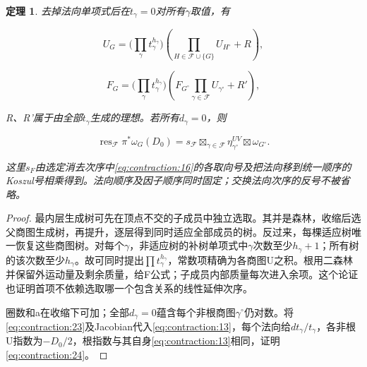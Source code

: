 \documentclass[11pt,a4paper,oneside]{ctexart}
\theoremstyle{cnplain}
\newtheorem{theorem}{定理}[section]
\theoremstyle{definition}
\theoremstyle{remark}
\numberwithin{equation}{section}
\begin{document}
\begin{theorem}

\label{thm:contraction:6.1} 去掉法向单项式后在\(t_\gamma =0\)对所有\(\gamma \)取值，有

\begin{equation}
U_G=\Big(\prod_\gamma t_\gamma^{h_\gamma}\Big)
       \left(\prod_{H\in\mathscr F\cup\{G\}}U_{H^\circ}+R\right),
\end{equation}

\begin{equation}
F_G=\Big(\prod_\gamma t_\gamma^{h_\gamma}\Big)
       \left(F_{G^\circ}\prod_{\gamma\in\mathscr F}U_{\gamma^\circ}
                                                       +R'\right),          \label{eq:contraction:23}
\end{equation}

R、R'属于由全部\(t_\gamma \)生成的理想。若所有\(d_\gamma =0\)，则

\begin{equation}
\operatorname{res}_{\mathscr F}\pi^*\omega_G(D_0)
        =s_{\mathscr F}\mathop{\boxtimes}_{\gamma\in\mathscr F}\eta_{\gamma^\circ}^{UV}
                                                \boxtimes\omega_{G^\circ}.
                                                                    \label{eq:contraction:24}
\end{equation}

这里\(s_F\)由选定消去次序中\eqref{eq:contraction:16}的各取向号及把法向移到统一顺序的Koszul号相乘得到。法向顺序及因子顺序同时固定；交换法向次序的反号不被省略。

\end{theorem}

\begin{proof}

最内层生成树可先在顶点不交的子成员中独立选取。其并是森林，收缩后选父商图生成树，再提升，逐层得到同时适应全部成员的树。反过来，每棵适应树唯一恢复这些商图树。对每个\(\gamma \)，非适应树的补树单项式中\(\gamma \)次数至少\(h_\gamma +1\)；所有树的该次数至少\(h_\gamma \)。故可同时提出\(\prod t_\gamma ^{h_\gamma }\)，常数项精确为各商图U之积。根用二森林并保留外运动量及剩余质量，给F公式；子成员内部质量每次进入余项。这个论证也证明首项不依赖选取哪一个包含关系的线性延伸次序。

圈数和a在收缩下可加；全部\(d_\gamma =0\)蕴含每个非根商图\(\gamma ^\circ\)仍对数。将\eqref{eq:contraction:23}及Jacobian代入\eqref{eq:contraction:13}，每个法向给\(dt_\gamma /t_\gamma \)，各非根U指数为\(- D_0/2\)，根指数与其自身\eqref{eq:contraction:13}相同，证明\eqref{eq:contraction:24}。

\end{proof}
\end{document}
